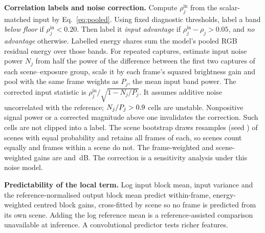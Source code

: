 \noindent\textbf{Correlation labels and noise correction.} Compute
$\rho_j^{\mathrm{in}}$ from the scalar-matched input by Eq.~\eqref{eq:pooled}.
Using fixed diagnostic thresholds, label a band \emph{below floor} if
$\rho_j^{\mathrm{in}}<0.20$. Then label it \emph{input advantage} if
$\rho_j^{\mathrm{in}}-\rho_j>0.05$, and \emph{no advantage} otherwise.
 Labelled energy shares sum the model's pooled RGB residual energy over those bands.
For repeated captures, estimate input noise power $N_j$ from half the power of
the difference between the first two captures of each scene--exposure group,
scale it by each frame's squared brightness gain and
pool with the same frame weights as $P_j$, the mean input band power.
The corrected input statistic is
$\rho_j^{\mathrm{in}}/\sqrt{1-N_j/P_j}$.
It assumes additive noise uncorrelated with the reference; $N_j/P_j>0.9{}$ cells are
unstable. Nonpositive signal power or a corrected magnitude above one invalidates the correction. Such cells are not clipped into a label. The scene bootstrap draws \nBootB{} resamples (seed \nBootSeed{}) of scenes with equal probability and retains
all frames of each, so scenes count equally and frames within a scene do not. The frame-weighted and scene-weighted gains are \nFfrW{} and \nFscW{}\,dB.
The correction is a sensitivity analysis under this noise model.

\noindent\textbf{Predictability of the local term.} Log input block mean, input variance and the
reference-normalised output block mean predict within-frame, energy-weighted centred block gains,
cross-fitted by scene so no frame is predicted from its own scene. Adding the log reference mean is a reference-assisted comparison unavailable at inference. A convolutional predictor tests richer features.

